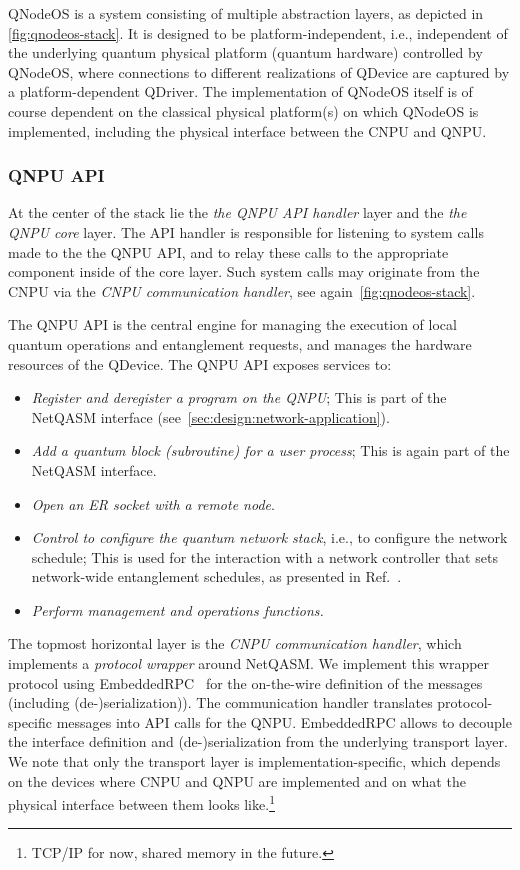\ac{QNodeOS} is a system consisting of multiple abstraction layers, as depicted in \cref{fig:qnodeos-stack}. It is designed to be platform-independent, i.e., independent of the underlying quantum physical platform (quantum hardware) controlled by \ac{QNodeOS}, where connections to different realizations of \ac{QDevice} are captured by a platform-dependent \ac{QDriver}. The implementation of \ac{QNodeOS} itself is of course dependent on the classical physical platform(s) on which \ac{QNodeOS} is implemented, including the physical interface between the \ac{CNPU} and \ac{QNPU}.

\subsubsection{QNPU API}
\label{sec:QNPU-api}

At the center of the stack lie the \emph{the \ac{QNPU} \ac{API} handler} layer and the \emph{the \ac{QNPU} core} layer. The \ac{API} handler is responsible for listening to system calls made to the the \ac{QNPU} \ac{API}, and to relay these calls to the appropriate component inside of the core layer. Such system calls may originate from the \ac{CNPU} via the \emph{CNPU communication handler}, see again~\cref{fig:qnodeos-stack}. 

The \ac{QNPU} \ac{API} is the central engine for managing the execution of local quantum operations and entanglement requests, and manages the hardware resources of the \ac{QDevice}. The \ac{QNPU} \ac{API} exposes services to:
%
\begin{itemize}
\item \emph{Register and deregister a program on the \ac{QNPU}}; This is part of the \ac{NetQASM} interface (see~\cref{sec:design:network-application}).
\item \emph{Add a quantum block (subroutine) for a user process}; This is again part of the \ac{NetQASM} interface.
\item \emph{Open an \ac{ER} socket with a remote node}.
\item \emph{Control to configure the quantum network stack}, i.e., to configure the network schedule; This is used for the interaction with a network controller that sets network-wide entanglement schedules, as presented in Ref.~\cite{skrzypczyk_2021_arch}.
\item \emph{Perform management and operations functions.}
\end{itemize}
%
The topmost horizontal layer is the \emph{\ac{CNPU} communication handler}, which implements a \emph{protocol wrapper} around \ac{NetQASM}.
We implement this wrapper protocol using EmbeddedRPC~\cite{erpc} for the on-the-wire definition of the messages (including (de-)serialization)). The communication handler translates protocol-specific messages into \ac{API} calls for the \ac{QNPU}. EmbeddedRPC allows to decouple the interface definition and (de-)serialization from the underlying transport layer. We note that only the transport layer is implementation-specific, which depends on the devices where \ac{CNPU} and \ac{QNPU} are implemented and on what the physical interface between them looks like.\footnote{TCP/IP for now, shared memory in the future.}

